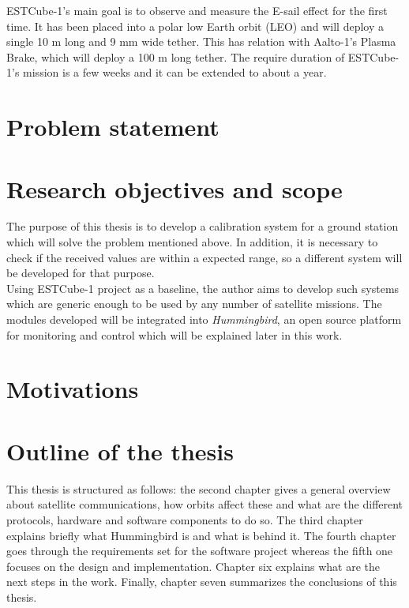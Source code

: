ESTCube-1's main goal is to observe and measure the E-sail effect for the first time. It has been placed into a polar low Earth orbit (LEO) and will deploy a single 10 m long and 9 mm wide tether\cite{ESTCube}. This has relation with Aalto-1's Plasma Brake, which will deploy a 100 m long tether. The require duration of ESTCube-1's mission is a few weeks and it can be extended to about a year.



\section{Problem statement}\label{1.2}


\section{Research objectives and scope}

The purpose of this thesis is to develop a calibration system for a ground station which will solve the problem mentioned above. In addition, it is necessary to check if the received values are within a expected range, so a different system will be developed for that purpose.\\

Using ESTCube-1 project as a baseline, the author aims to develop such systems which are generic enough to be used by any number of satellite missions. The modules developed will be integrated into \emph{Hummingbird}, an open source platform for monitoring and control which will be explained later in this work. 





\section{Motivations}



\section{Outline of the thesis}
This thesis is structured as follows: the second chapter gives a general overview about satellite communications, how orbits affect these and what are the different protocols, hardware and software components to do so. The third chapter explains briefly what Hummingbird is and what is behind it. The fourth chapter goes through the requirements set for the software project whereas the fifth one focuses on the design and implementation. Chapter six explains what are the next steps in the work. Finally, chapter seven summarizes the conclusions of this thesis.

\newpage
